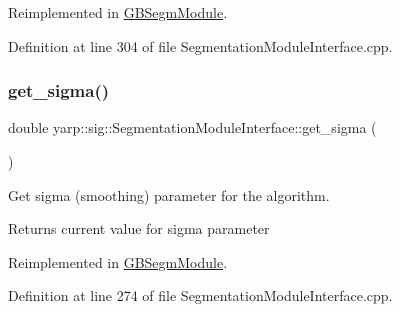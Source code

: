 Reimplemented in \hyperlink{classGBSegmModule_a655ee7c895eed07b07099133b9d8ce68}{G\+B\+Segm\+Module}.



Definition at line 304 of file Segmentation\+Module\+Interface.\+cpp.


\mbox{\label{classyarp_1_1sig_1_1SegmentationModuleInterface_a38431f2c63d7da8ebf20adf0ed1da4fe}} 
\subsubsection{\texorpdfstring{get\+\_\+sigma()}{get\_sigma()}}
{\footnotesize\ttfamily double yarp\+::sig\+::\+Segmentation\+Module\+Interface\+::get\+\_\+sigma (\begin{DoxyParamCaption}{ }\end{DoxyParamCaption})\hspace{0.3cm}{\ttfamily [virtual]}}



Get sigma (smoothing) parameter for the algorithm. 

\begin{DoxyReturn}{Returns}
current value for sigma parameter 
\end{DoxyReturn}


Reimplemented in \hyperlink{classGBSegmModule_ae32ae1b1461e19c3a1b2f429c729ed03}{G\+B\+Segm\+Module}.



Definition at line 274 of file Segmentation\+Module\+Interface.\+cpp.


